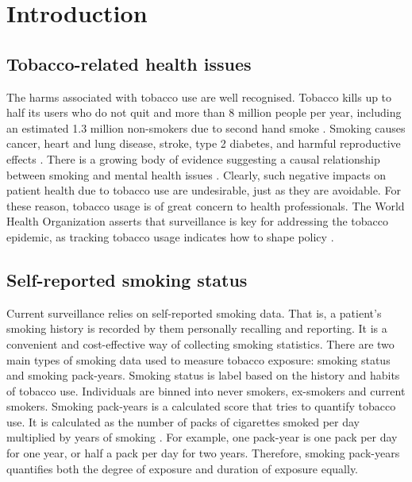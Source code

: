 \documentclass{article}
\begin{document}
\listoffigures
\listofequations
\listoftables

\newpage
{}

\section{Introduction}
\subsection{Tobacco-related health issues}
The harms associated with tobacco use are well recognised. Tobacco kills up to half its users who do not quit and more than 8 million people per year, including an estimated 1.3 million non-smokers due to second hand smoke \cite{who_tobacco}. Smoking causes cancer, heart and lung disease, stroke, type 2 diabetes, and harmful reproductive effects \cite{hhs_smoking_2014}. There is a growing body of evidence suggesting a causal relationship between smoking and mental health issues \cite{taylor2019smoking}. Clearly, such negative impacts on patient health due to tobacco use are undesirable, just as they are avoidable. For these reason, tobacco usage is of great concern to health professionals. The World Health Organization asserts that surveillance is key for addressing the tobacco epidemic, as tracking tobacco usage indicates how to shape policy \cite{who_tobacco}.

\subsection{Self-reported smoking status}
Current surveillance relies on self-reported smoking data. That is, a patient's smoking history is recorded by them personally recalling and reporting. It is a convenient and cost-effective way of collecting smoking statistics. There are two main types of smoking data used to measure tobacco exposure: smoking status and smoking pack-years. Smoking status is label based on the history and habits of tobacco use. Individuals are binned into never smokers, ex-smokers and current smokers. Smoking pack-years is a calculated score that tries to quantify tobacco use. It is calculated as the number of packs of cigarettes smoked per day multiplied by years of smoking \cite{smokingpackyears}. For example, one pack-year is one pack per day for one year, or half a pack per day for two years. Therefore, smoking pack-years quantifies both the degree of exposure and duration of exposure equally.
\end{document}
